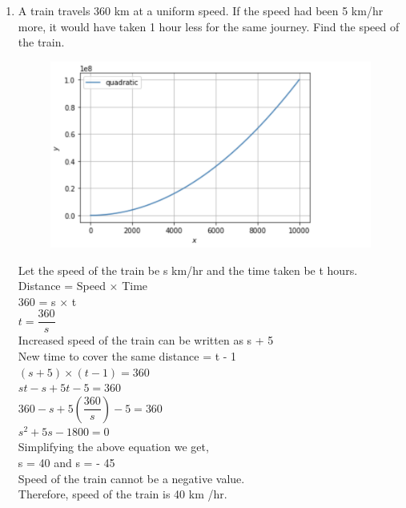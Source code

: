 \documentclass[journal,12pt,twocolumn]{IEEEtran}
\renewcommand\thesection{\arabic{section}}
\begin{document}
\begin{enumerate}[label=\thesection.\arabic*.,ref=\thesection.\theenumi]
\item A train travels 360 km at a uniform speed. If the speed had been 5 km/hr more, it would have taken 1 hour less for the same journey. Find the speed of the train. \\
 \begin{figure}
	  \centering 
	  \includegraphics[width=\columnwidth]{5.3}
	  \caption{}
	  \label{fig:geometry-3.9.pdf}
 \end{figure}

\solution Let the speed of the train be s km/hr and the time taken be t hours.\\
Distance = Speed × Time \\
360 = s × t \\

$t = \dfrac{360}{s}$ \\
Increased speed of the train can be written as s + 5 \\
New time to cover the same distance = t - 1 \\
$(s + 5) × (t - 1) = 360$ \\
$st - s + 5t - 5 = 360$ \\

$360 - s + 5(\dfrac{360}{s}) - 5 = 360$\\

$s^2 + 5s - 1800 = 0$ \\ 
Simplifying the above equation we get, \\
s = 40 and s = - 45 \\
Speed of the train cannot be a negative value.\\
Therefore, speed of the train is 40 km /hr. \\


\end{enumerate}
\end{document}
